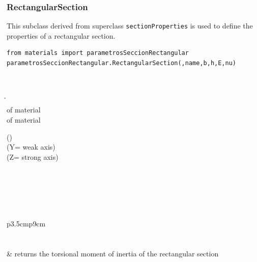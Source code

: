 \subsubsection{RectangularSection}
\noindent This subclass derived from superclass {\tt sectionProperties} is used to define the properties of a rectangular section.
\begin{verbatim}
from materials import parametrosSeccionRectangular
parametrosSeccionRectangular.RectangularSection(,name,b,h,E,nu)
\end{verbatim}
\begin{paramClassTable}
 \\
\bX{} \\
\h{} \\
\E{} of material\\
\nuX of material \\
\end{paramClassTable}
\begin{methodsTable}
\A(){} \\
\Iy{()}  (Y= weak axis)\\
\Iz{()}  (Z= strong axis)\\
\J{()} \\
\Wyel{()}\\
\Wzel{()} \\
\alphaY{()}\\
\alphaZ{()}\\
\end{methodsTable}

\begin{center}
\begin{tabular}{p{3.5cm}p{9cm}}
 \\
 \\
 \\
& returns the torsional moment of inertia of the rectangular section \\
\end{tabular}
\end{center}

